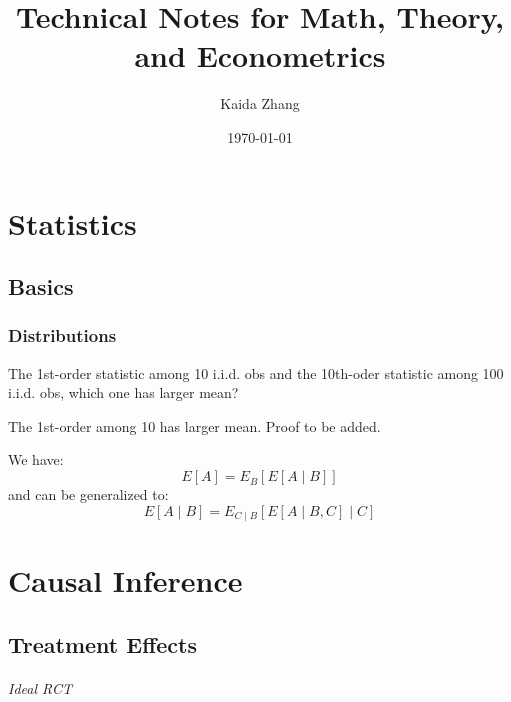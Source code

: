 

\title{Technical Notes for Math, Theory, and Econometrics}
\author{Kaida Zhang}
\date{\today}



\maketitle

\part{Statistics}

\chapter{Basics} %
\label{cha:basics}

\section{Distributions} %
\label{sec:distributions}


\begin{que}
    The 1st-order statistic among 10 i.i.d. obs and the 10th-oder statistic among 100 i.i.d. obs, which one has larger mean? 
\end{que}

\begin{answer}
    The 1st-order among 10 has larger mean. Proof to be added.
\end{answer}

\begin{thm}
    We have:
    \[E[A] = E_B[E[A \mid B]]\]
    and can be generalized to:
    \[E[A \mid B] = E_{C \mid B}[E[A \mid B,C] \mid C]\]
\end{thm}


\part{Causal Inference}
    
\chapter{Treatment Effects} %
\label{cha:treatment_effects}

\paragraph{Ideal RCT}


